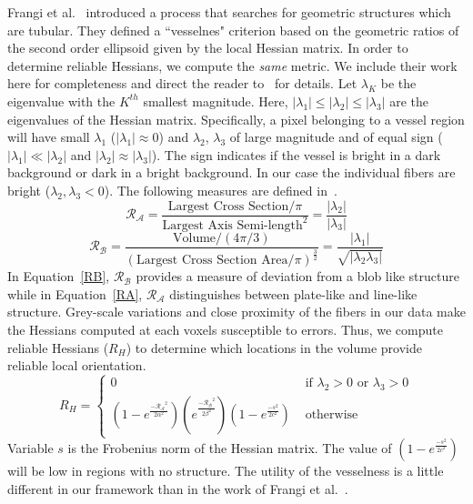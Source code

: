 Frangi et al.~\cite{Frangi1998} introduced a process that searches for geometric structures which are tubular. They defined 
a ``vesselnes" criterion based on the geometric ratios of the second order ellipsoid given by the local Hessian matrix.
In order to determine reliable Hessians, we compute the \textit{same} metric. We include their work here for completeness and direct the reader to~\cite{Frangi1998} for details. Let $\lambda_{K}$ be the eigenvalue with the $K^{th}$ smallest magnitude. Here, $|{\lambda}_{1}| \leq| {\lambda}_{2}|\leq| {\lambda}_{3}| $ are the eigenvalues of the Hessian matrix. Specifically, a pixel belonging to a vessel region will have small $\lambda_{1}$ ($|\lambda_{1}|\approx 0$) and $\lambda_{2}$, $\lambda_{3}$ of large magnitude and of equal sign ($|\lambda_{1}| \ll |\lambda_{2}|$ and $|\lambda_{2}|\approx |\lambda_{3}|$). The sign indicates if the vessel is bright in a dark background or dark in a bright background. In our case the individual fibers are bright ($\lambda_2,\lambda_3 < 0$). The following measures are defined in~\cite{Frangi1998}.  
\begin{equation}\label{RA}
\mathcal{R_{A}}=\frac{\textrm{Largest  Cross Section}\big/ \pi}{{\textrm{Largest Axis Semi-length}}^{2}}=\frac{|\lambda_{2}|}{|\lambda_{3}|}
\end{equation}
\begin{equation}\label{RB}
\mathcal{R_{B}}=\frac{\textrm{Volume}\big/ (4\pi \big/ 3)}{{(\textrm{Largest Cross Section Area}\big/ \pi)}^{\frac{3}{2}}}=\frac{|\lambda_{1}|}{\sqrt{|\lambda_{2}\lambda_{3}|}}
\end{equation}
In Equation~\ref{RB}, $\mathcal{R_{B}}$ provides a measure of deviation from a blob like structure while in Equation~\ref{RA}, $\mathcal{R_{A}}$ distinguishes between plate-like and line-like structure. Grey-scale variations and close proximity of the fibers in our data make the Hessians computed at each voxels susceptible to errors. Thus, we compute reliable Hessians ($R_H$) to determine which locations in the volume provide reliable local orientation. 
$$
R_{H} = \left\{ \begin{array}{ccc}
0 & \mbox{ if $\lambda_{2}>0$ or $\lambda_{3}>0$} \\
(1-e^{\frac{\mathcal{-R_{A}}^{2}}{2\alpha^{2}}})
(e^{\frac{\mathcal{-R_{B}}^{2}}{2\beta^{2}}}) (1-e^{\frac{-s^2}{2c^2}}) &\mbox{ otherwise}
\end{array} \right.
$$
Variable $s$ is the Frobenius norm of the Hessian matrix. The value of $(1-e^{\frac{-s^2}{2c^2}})$ will be low in regions with no structure. The utility of the vesselness is a little different in our framework than in the work of Frangi et al.~\cite{Frangi1998}.

